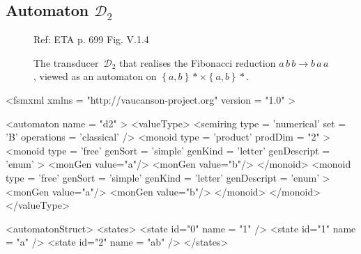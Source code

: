 \subsection{Automaton $\mathcal{D}_{2}$}
\label{automatonD2fmp}

\begin{figure}[h]
  \begin{minipage}[c]{.60\textwidth}
    Ref: ETA p. 699  Fig. V.1.4

    The transducer~$\mathcal{D}_{2}$ that realises the Fibonacci reduction
    $a\, b\, b \rightarrow b\, a\, a$, viewed as an automaton on
    $\left\{ a,b \right\}* \times \left\{ a,b \right\}*$.

  \end{minipage}
  \begin{minipage}[c]{.40\textwidth}


  \end{minipage}
\end{figure}

{\footnotesize
\begin{listing}[5]{1}
<fsmxml  xmlns   = "http://vaucanson-project.org"
         version = "1.0" >

<automaton name = "d2" >
  <valueType>
    <semiring  type       = 'numerical'
               set        = 'B'
               operations = 'classical' />
    <monoid    type       = 'product'
               prodDim    = "2" >
      <monoid    type        = 'free'
                 genSort     = 'simple'
                 genKind     = 'letter'
                 genDescript = 'enum' >
        <monGen value="a"/>
        <monGen value="b"/>
      </monoid>
      <monoid    type        = 'free'
                 genSort     = 'simple'
                 genKind     = 'letter'
                 genDescript = 'enum' >
        <monGen value="a"/>
        <monGen value="b"/>
      </monoid>
    </monoid>
  </valueType>

  <automatonStruct>
    <states>
      <state  id="0"  name = "1" />
      <state  id="1"  name = "a" />
      <state  id="2"  name = "ab" />
    </states>

\end{listing}
}

